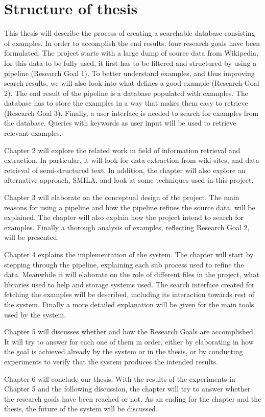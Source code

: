 \section{Structure of thesis}
This thesis will describe the process of creating a searchable database consisting of examples. In order to accomplish the end results, four research goals have been formulated. The project starts with a large dump of source data from Wikipedia, for this data to be fully used, it first has to be filtered and structured by using a pipeline (Research Goal 1). To better understand examples, and thus improving search results, we will also look into what defines a good example (Research Goal 2). The end result of the pipeline is a database populated with examples. The database has to store the examples in a way that makes them easy to retrieve (Research Goal 3). Finally, a user interface is needed to search for examples from the database. Queries with keywords as user input will be used to retrieve relevant examples.

Chapter 2 will explore the related work in field of information retrieval and extraction. In particular, it will look for data extraction from wiki sites, and data retrieval of semi-structured text. In addition, the chapter will also explore an alternative approach, SMILA, and look at some techniques used in this project.

Chapter 3 will elaborate on the conceptual design of the project. The main reasons for using a pipeline and how the pipeline refines the source data, will be explained. The chapter will also explain how the project intend to search for examples. Finally a thorough analysis of examples, reflecting Research Goal 2, will be presented.

Chapter 4 explains the implementation of the system. The chapter will start by stepping through the pipeline, explaining each sub process used to refine the data. Meanwhile it will elaborate on the role of different files in the project, what libraries used to help and storage systems used. The search interface created for fetching the examples will be described, including its interaction towards rest of the system. Finally a more detailed explanation will be given for the main tools used by the system.

Chapter 5 will discusses whether and how the Research Goals are accomplished. It will try to answer for each one of them in order, either by elaborating in how the goal is achieved already by the system or in the thesis, or by conducting experiments to verify that the system produces the intended results.

Chapter 6 will conclude our thesis. With the results of the experiments in Chapter 5 and the following discussion, the chapter will try to answer whether the research goals have been reached or not. As an ending for the chapter and the thesis, the future of the system will be discussed.


\cleardoublepage